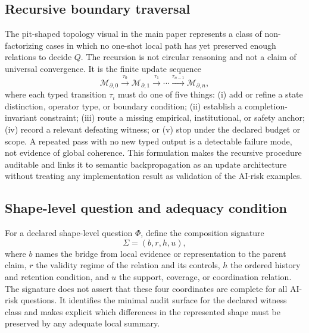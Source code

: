 \documentclass[10pt]{article}
\begin{document}
\subsection{Recursive boundary traversal}
\label{sec:recursive-traversal}

The pit-shaped topology visual in the main paper represents a class of non-factorizing cases in which no one-shot local path has yet preserved enough relations to decide $Q$. The recursion is not circular reasoning and not a claim of universal convergence. It is the finite update sequence
\begin{equation}
\mathcal{M}_{\partial,0}\xrightarrow{\tau_0}\mathcal{M}_{\partial,1}\xrightarrow{\tau_1}\cdots\xrightarrow{\tau_{n-1}}\mathcal{M}_{\partial,n},
\label{eq:recursive-traversal}
\end{equation}
where each typed transition $\tau_i$ must do one of five things: (i) add or refine a state distinction, operator type, or boundary condition; (ii) establish a completion-invariant constraint; (iii) route a missing empirical, institutional, or safety anchor; (iv) record a relevant defeating witness; or (v) stop under the declared budget or scope. A repeated pass with no new typed output is a detectable failure mode, not evidence of global coherence. This formulation makes the recursive procedure auditable and links it to semantic backpropagation as an update architecture without treating any implementation result as validation of the AI-risk examples.

\subsection{Shape-level question and adequacy condition}

For a declared shape-level question $\Phi$, define the composition signature
\begin{equation}
\Sigma=(b,r,h,u),
\label{eq:composition-signature-supp}
\end{equation}
where $b$ names the bridge from local evidence or representation to the parent claim, $r$ the validity regime of the relation and its controls, $h$ the ordered history and retention condition, and $u$ the support, coverage, or coordination relation. The signature does not assert that these four coordinates are complete for all AI-risk questions. It identifies the minimal audit surface for the declared witness class and makes explicit which differences in the represented shape must be preserved by any adequate local summary.
\end{document}

